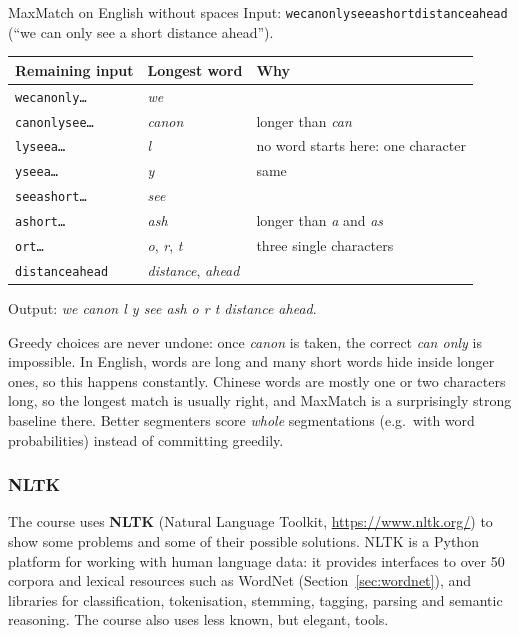 \begin{nbexample}{MaxMatch on English without spaces}
Input: \texttt{wecanonlyseeashortdistanceahead} (``we can only see a short distance
ahead'').
\begin{center}
\small
\begin{tabular}{@{}l l l@{}}
\toprule
\textbf{Remaining input} & \textbf{Longest word} & \textbf{Why} \\
\midrule
\texttt{wecanonly\ldots}  & \emph{we}       & \\
\texttt{canonlysee\ldots} & \emph{canon}    & longer than \emph{can} \\
\texttt{lyseea\ldots}     & \emph{l}        & no word starts here: one character \\
\texttt{yseea\ldots}      & \emph{y}        & same \\
\texttt{seeashort\ldots}  & \emph{see}      & \\
\texttt{ashort\ldots}     & \emph{ash}      & longer than \emph{a} and \emph{as} \\
\texttt{ort\ldots}        & \emph{o}, \emph{r}, \emph{t} & three single characters \\
\texttt{distanceahead}    & \emph{distance}, \emph{ahead} & \\
\bottomrule
\end{tabular}
\end{center}
Output: \emph{we canon l y see ash o r t distance ahead}.
\end{nbexample}

\begin{nbintuition}
Greedy choices are never undone: once \emph{canon} is taken, the correct \emph{can only}
is impossible. In English, words are long and many short words hide inside longer ones,
so this happens constantly. Chinese words are mostly one or two characters long, so the
longest match is usually right, and MaxMatch is a surprisingly strong baseline there.
Better segmenters score \emph{whole} segmentations (e.g.\ with word probabilities)
instead of committing greedily.
\end{nbintuition}

\subsubsection{NLTK}

The course uses \textbf{NLTK} (Natural Language Toolkit, \url{https://www.nltk.org/})
to show some problems and some of their possible solutions. NLTK is a Python platform
for working with human language data: it provides interfaces to over 50 corpora and
lexical resources such as WordNet (Section~\ref{sec:wordnet}), and libraries for
classification, tokenisation, stemming, tagging, parsing and semantic reasoning. The
course also uses less known, but elegant, tools.

